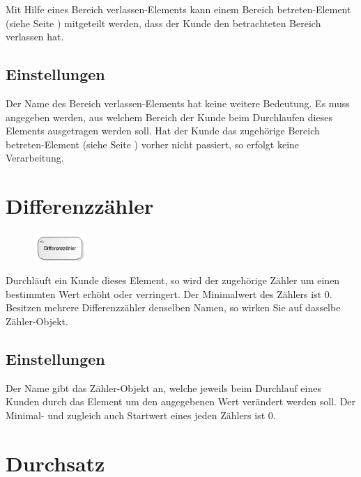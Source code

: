 Mit Hilfe eines Bereich verlassen-Elements kann einem
Bereich betreten-Element (siehe Seite \pageref{ref:ModelElementSectionStart}) 
mitgeteilt werden, dass der Kunde den betrachteten Bereich verlassen hat.

\subsection*{Einstellungen}

Der Name des Bereich verlassen-Elements hat keine weitere Bedeutung.
Es muss angegeben werden, aus welchem Bereich der Kunde beim Durchlaufen dieses
Elements ausgetragen werden soll. Hat der Kunde das zugehörige
Bereich betreten-Element (siehe Seite \pageref{ref:ModelElementSectionStart}) 
vorher nicht passiert, so erfolgt keine Verarbeitung.


\section{Differenzzähler}
\label{ref:ModelElementDifferentialCounter}

\begin{figure}
\vspace{-22pt}
\includegraphics[width=2cm]{imageModelElementDifferentialCounter.png}
\vspace{-22pt}
\end{figure}

Durchläuft ein Kunde dieses Element, so wird der zugehörige Zähler um einen bestimmten Wert erhöht oder verringert.
Der Minimalwert des Zählers ist 0. Besitzen mehrere Differenzzähler denselben Namen, so wirken Sie auf dasselbe
Zähler-Objekt.

\subsection*{Einstellungen}

Der Name gibt das Zähler-Objekt an, welche jeweils beim Durchlauf eines Kunden durch das Element um den
angegebenen Wert verändert werden soll. Der Minimal- und zugleich auch Startwert eines jeden Zählers ist 0.


\section{Durchsatz}
\label{ref:ModelElementThroughput}

